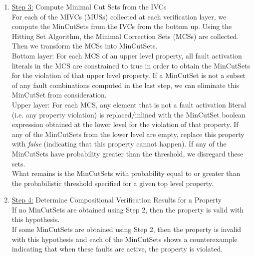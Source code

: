 \begin{enumerate}[label=(\roman*)]
\item \underline{Step 3:} Compute Minimal Cut Sets from the IVCs \\

For each of the MIVCs (MUSs) collected at each verification layer, we compute the MinCutSets from the IVCs from the bottom up. Using the Hitting Set Algorithm, the Minimal Correction Sets (MCSs) are collected. Then we transform the MCSs into MinCutSets.  \\

Bottom layer: For each MCS of an upper level property, all fault activation literals in the MCS are constrained to true in order to obtain the MinCutSets for the violation of that upper level property. If a MinCutSet is not a subset of any fault combinations computed in the last step, we can eliminate this MinCutSet from consideration.  \\

Upper layer: For each MCS, any element that is not a fault activation literal (i.e. any property violation) is replaced/inlined with the MinCutSet boolean expression obtained at the lower level for the violation of that property. If any of the MinCutSets from the lower level are empty, replace this property with \textit{false} (indicating that this property cannot happen).   If any of the MinCutSets have probability greater than the threshold, we disregard these sets.\\

What remains is the MinCutSets with probability equal to or greater than the probabilistic threshold specified for a given top level property. \\

\item \underline{Step 4:} Determine Compositional Verification Results for a Property \\

If no MinCutSets are obtained using Step 2, then the property is valid with this hypothesis.  \\

If some MinCutSets are obtained using Step 2, then the property is invalid with this hypothesis and each of the MinCutSets shows a counterexample indicating that when these faults are active, the property is violated. \\

\end{enumerate}






























